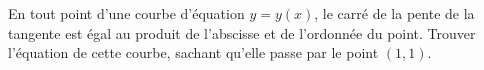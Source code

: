 \begin{exercice}\label{exoEquaDiff0009}

En tout point d'une courbe d'équation $y=y(x)$, le carré de la pente de la tangente est égal au produit de l'abscisse et de l'ordonnée du point. Trouver l'équation de cette courbe, sachant qu'elle passe par le point $(1,1)$.

\end{exercice}
